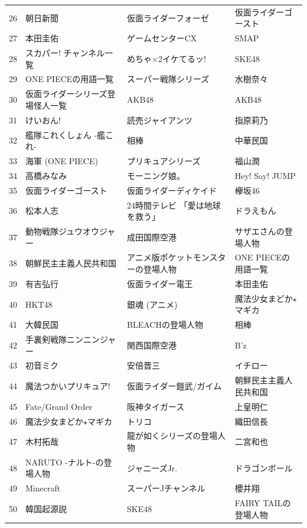 \documentclass[10pt,british,A4paper,,openany]{memoir}
\begin{document}
\begin{table}
{\begin{tabular}{@{}p{0.1cm}lll@{}}
26&朝日新聞&仮面ライダーフォーゼ&仮面ライダーゴースト\\
27&本田圭佑&ゲームセンターCX&SMAP\\
28&スカパー! チャンネル一覧&めちゃ×2イケてるッ!&SKE48\\
29&ONE PIECEの用語一覧&スーパー戦隊シリーズ&水樹奈々\\
30&仮面ライダーシリーズ登場怪人一覧&AKB48&AKB48\\
31&けいおん!&読売ジャイアンツ&指原莉乃\\
32&艦隊これくしょん -艦これ-&相棒&中華民国\\
33&海軍 (ONE PIECE)&プリキュアシリーズ&福山潤\\
34&高橋みなみ&モーニング娘。&Hey! Say! JUMP\\
35&仮面ライダーゴースト&仮面ライダーディケイド&欅坂46\\
36&松本人志&24時間テレビ 「愛は地球を救う」&ドラえもん\\
37&動物戦隊ジュウオウジャー&成田国際空港&サザエさんの登場人物\\
38&朝鮮民主主義人民共和国&アニメ版ポケットモンスターの登場人物&ONE PIECEの用語一覧\\
39&有吉弘行&仮面ライダー電王&本田圭佑\\
40&HKT48&銀魂 (アニメ)&魔法少女まどか$\star$マギカ\\
41&大韓民国&BLEACHの登場人物&相棒\\
42&手裏剣戦隊ニンニンジャー&関西国際空港&B'z\\
43&初音ミク&安倍晋三&イチロー\\
44&魔法つかいプリキュア!&仮面ライダー鎧武/ガイム&朝鮮民主主義人民共和国\\
45&Fate/Grand Order&阪神タイガース&上皇明仁\\
46&魔法少女まどか$\star$マギカ&トリコ&織田信長\\
47&木村拓哉&龍が如くシリーズの登場人物&二宮和也\\
48&NARUTO -ナルト-の登場人物&ジャニーズJr.&ドラゴンボール\\
49&Minecraft&スーパーJチャンネル&櫻井翔\\
50&韓国起源説&SKE48&FAIRY TAILの登場人物\\
\bottomrule
\end{tabular}
}
\end{table}
\end{document}
